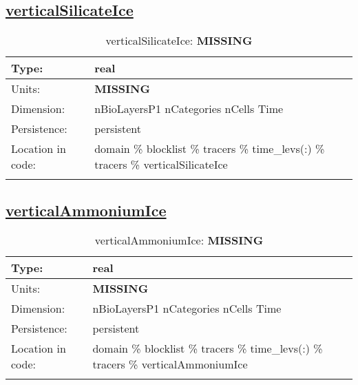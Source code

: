 \subsection[verticalSilicateIce]{\hyperref[sec:var_tab_tracers]{verticalSilicateIce}}
\label{subsec:var_sec_tracers_verticalSilicateIce}
\begin{center}
\begin{longtable}{| p{2.0in} | p{4.0in} |}
        \hline 
        Type: & real \\
        \hline 
        Units: & {\bf \color{red} MISSING} \\
        \hline 
        Dimension: & nBioLayersP1 nCategories nCells Time \\
        \hline 
        Persistence: & persistent \\
        \hline 
         Location in code: & domain \% blocklist \% tracers \% time\_levs(:) \% tracers \% verticalSilicateIce \\
         \hline 
    \caption{verticalSilicateIce: {\bf \color{red} MISSING}}
\end{longtable}
\end{center}
\subsection[verticalAmmoniumIce]{\hyperref[sec:var_tab_tracers]{verticalAmmoniumIce}}
\label{subsec:var_sec_tracers_verticalAmmoniumIce}
\begin{center}
\begin{longtable}{| p{2.0in} | p{4.0in} |}
        \hline 
        Type: & real \\
        \hline 
        Units: & {\bf \color{red} MISSING} \\
        \hline 
        Dimension: & nBioLayersP1 nCategories nCells Time \\
        \hline 
        Persistence: & persistent \\
        \hline 
         Location in code: & domain \% blocklist \% tracers \% time\_levs(:) \% tracers \% verticalAmmoniumIce \\
         \hline 
    \caption{verticalAmmoniumIce: {\bf \color{red} MISSING}}
\end{longtable}
\end{center}
